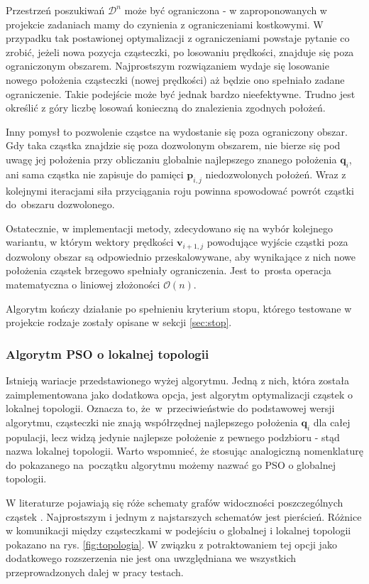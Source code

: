 \documentclass[11pt, a4paper, oneside]{article}
\newcommand{\vect}[1]{\bm{\mathbf{#1}}}
\begin{document}
Przestrzeń poszukiwań $\mathcal{D}^{n}$ może być ograniczona - w zaproponowanych w projekcie zadaniach mamy do czynienia z ograniczeniami kostkowymi. W przypadku tak postawionej optymalizacji z ograniczeniami powstaje pytanie co zrobić, jeżeli nowa pozycja cząsteczki, po losowaniu prędkości, znajduje się poza ograniczonym obszarem. Najprostszym rozwiązaniem wydaje się losowanie nowego położenia cząsteczki (nowej prędkości) aż będzie ono spełniało zadane ograniczenie. Takie podejście może być jednak bardzo nieefektywne. Trudno jest określić z góry liczbę losowań konieczną do znalezienia zgodnych położeń.

Inny pomysł to pozwolenie cząstce na wydostanie się poza ograniczony obszar. Gdy taka cząstka znajdzie się poza dozwolonym obszarem, nie bierze się pod uwagę jej położenia przy obliczaniu globalnie najlepszego znanego położenia $\vect{q}_{i}$, ani sama cząstka nie zapisuje do pamięci $\vect{p}_{i, j}$ niedozwolonych położeń. Wraz z kolejnymi iteracjami siła przyciągania roju powinna spowodować powrót cząstki do~obszaru dozwolonego.

Ostatecznie, w implementacji metody, zdecydowano się na wybór kolejnego wariantu, w którym wektory prędkości $\vect{v}_{i + 1, j}$ powodujące wyjście cząstki poza dozwolony obszar są odpowiednio przeskalowywane, aby wynikające z nich nowe położenia cząstek brzegowo spełniały ograniczenia. Jest to~prosta operacja matematyczna o liniowej złożoności $\mathcal{O}\left(n\right)$.

Algorytm kończy działanie po spełnieniu kryterium stopu, którego testowane w projekcie rodzaje zostały opisane w sekcji \ref{sec:stop}.

\subsubsection*{Algorytm PSO o lokalnej topologii}
Istnieją wariacje przedstawionego wyżej algorytmu. Jedną z nich, która została zaimplementowana jako dodatkowa opcja, jest algorytm optymalizacji cząstek o lokalnej topologii. Oznacza to, że~w~przeciwieństwie do podstawowej wersji algorytmu, cząsteczki nie znają współrzędnej najlepszego położenia $\vect{q}_{i}$ dla całej populacji, lecz widzą jedynie najlepsze położenie z pewnego podzbioru - stąd nazwa lokalnej topologii. Warto wspomnieć, że stosując analogiczną nomenklaturę do pokazanego na~początku algorytmu możemy nazwać go PSO o globalnej topologii.

W literaturze pojawiają się róże schematy grafów widoczności poszczególnych cząstek \cite{aguirre2007copso, BrattonKennedy}. Najprostszym i jednym z najstarszych schematów jest pierścień. Różnice w komunikacji między cząsteczkami w podejściu o globalnej i lokalnej topologii pokazano na rys. \ref{fig:topologia}. W związku z potraktowaniem tej opcji jako dodatkowego rozszerzenia nie jest ona uwzględniana we wszystkich przeprowadzonych dalej w pracy testach.
\end{document}
